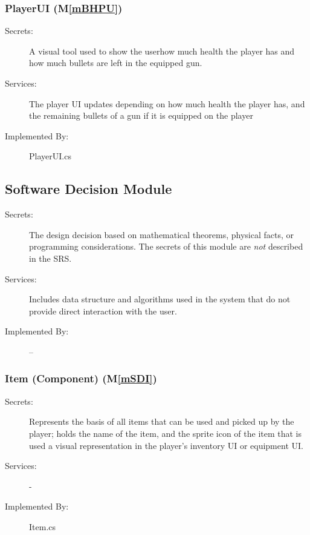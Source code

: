 \documentclass[12pt, titlepage]{article}
\newcommand{\mref}[1]{M\ref{#1}}
\begin{document}
\subsubsection{{\color{magenta} PlayerUI (\mref{mBHPU})}}

\begin{description}
	\item[Secrets:] {\color{magenta} A visual tool used to show the userhow much health the player has and how much bullets are left in the equipped gun.}
	\item[Services:] {\color{magenta} The player UI updates depending on how much health the player has, and the remaining bullets of a gun if it is equipped on the player}
	\item[Implemented By:] {\color{magenta}PlayerUI.cs}
\end{description}


\subsection{Software Decision Module}

\begin{description}
\item[Secrets:] The design decision based on mathematical theorems, physical
  facts, or programming considerations. The secrets of this module are
  \emph{not} described in the SRS.
\item[Services:] Includes data structure and algorithms used in the system that
  do not provide direct interaction with the user. 
\item[Implemented By:] --
\end{description}

\subsubsection{Item (Component) (\mref{mSDI})}

\begin{description}
\item[Secrets:] Represents the basis of all items that can be used {\color {magenta} and picked up} by the player; holds the name of the item, and the sprite icon {\color {magenta} of the item that is used a visual representation in the player's inventory UI or equipment UI.}
  
\item[Services:] -
\item[Implemented By:] Item.cs
\end{description}
\end{document}
